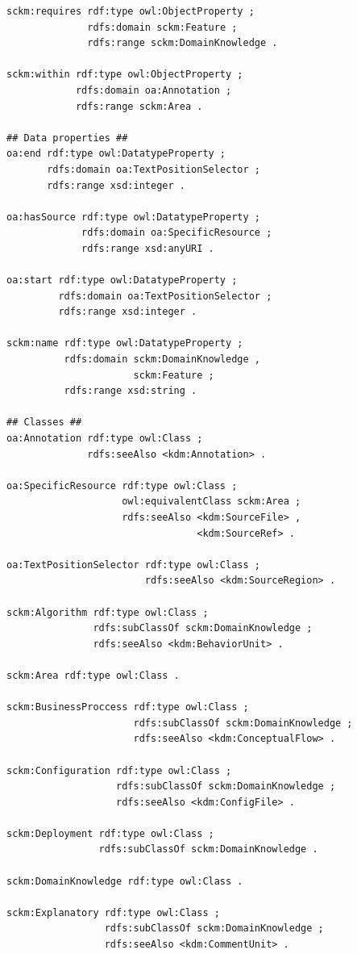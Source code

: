 \begin{appendix}
\begin{lstlisting}[language=turtle, captionpos=t, caption=SCKM Ontology Extract]
sckm:requires rdf:type owl:ObjectProperty ;
              rdfs:domain sckm:Feature ;
              rdfs:range sckm:DomainKnowledge .

sckm:within rdf:type owl:ObjectProperty ;
            rdfs:domain oa:Annotation ;
            rdfs:range sckm:Area .
            
## Data properties ##
oa:end rdf:type owl:DatatypeProperty ;
       rdfs:domain oa:TextPositionSelector ;
       rdfs:range xsd:integer .

oa:hasSource rdf:type owl:DatatypeProperty ;
             rdfs:domain oa:SpecificResource ;
             rdfs:range xsd:anyURI .

oa:start rdf:type owl:DatatypeProperty ;
         rdfs:domain oa:TextPositionSelector ;
         rdfs:range xsd:integer .

sckm:name rdf:type owl:DatatypeProperty ;
          rdfs:domain sckm:DomainKnowledge ,
                      sckm:Feature ;
          rdfs:range xsd:string .

## Classes ##
oa:Annotation rdf:type owl:Class ;
              rdfs:seeAlso <kdm:Annotation> .

oa:SpecificResource rdf:type owl:Class ;
                    owl:equivalentClass sckm:Area ;
                    rdfs:seeAlso <kdm:SourceFile> ,
                                 <kdm:SourceRef> .

oa:TextPositionSelector rdf:type owl:Class ;
                        rdfs:seeAlso <kdm:SourceRegion> .

sckm:Algorithm rdf:type owl:Class ;
               rdfs:subClassOf sckm:DomainKnowledge ;
               rdfs:seeAlso <kdm:BehaviorUnit> .

sckm:Area rdf:type owl:Class .

sckm:BusinessProccess rdf:type owl:Class ;
                      rdfs:subClassOf sckm:DomainKnowledge ;
                      rdfs:seeAlso <kdm:ConceptualFlow> .

sckm:Configuration rdf:type owl:Class ;
                   rdfs:subClassOf sckm:DomainKnowledge ;
                   rdfs:seeAlso <kdm:ConfigFile> .

sckm:Deployment rdf:type owl:Class ;
                rdfs:subClassOf sckm:DomainKnowledge .

sckm:DomainKnowledge rdf:type owl:Class .

sckm:Explanatory rdf:type owl:Class ;
                 rdfs:subClassOf sckm:DomainKnowledge ;
                 rdfs:seeAlso <kdm:CommentUnit> .


\end{lstlisting}
\end{appendix}
